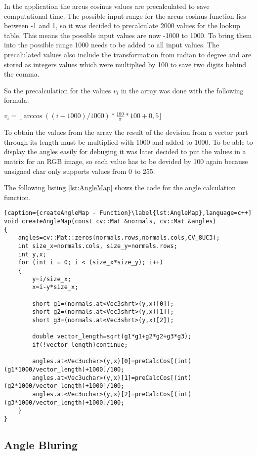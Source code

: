 In the application the arcus cosinus values are precalculated to save computational time.
The possible input range for the arcus cosinus function lies between -1 and 1, so it was decided
to precalculate 2000 values for the lookup table. This means the possible input values are now
-1000 to 1000. To bring them into the possible range 1000 needs to be added to all input values.
The precalulated values also include the transformation from radian to degree and are stored as 
integers values which were multiplied by 100 to save two digits behind the comma.

So the precalculation for the values $v_i$ in the array was done with the following formula:

$v_i=\lfloor \arccos ((i-1000)/1000) * \frac{180}{\pi}*100 + 0,5 \rfloor$

To obtain the values from the array the result of the devision from a vector part through its length
must be multiplied with 1000 and added to 1000. To be able to display the angles easily for debuging 
it was later decided to put the values in a matrix for an RGB image, so each value has to be devided 
by 100 again because unsigned char only supports values from 0 to 255.

The following listing \vref{lst:AngleMap} shows the code for the angle calculation function.

\begin{lstlisting}[caption={createAngleMap - Function}\label{lst:AngleMap},language=c++]
void createAngleMap(const cv::Mat &normals, cv::Mat &angles)
{
	angles=cv::Mat::zeros(normals.rows,normals.cols,CV_8UC3);
	int size_x=normals.cols, size_y=normals.rows;
	int y,x;
	for (int i = 0; i < (size_x*size_y); i++)
	{ 
		y=i/size_x;
		x=i-y*size_x;

		short g1=(normals.at<Vec3shrt>(y,x)[0]);
		short g2=(normals.at<Vec3shrt>(y,x)[1]);
		short g3=(normals.at<Vec3shrt>(y,x)[2]);

		double vector_length=sqrt(g1*g1+g2*g2+g3*g3);
		if(!vector_length)continue;

		angles.at<Vec3uchar>(y,x)[0]=preCalcCos[(int)(g1*1000/vector_length)+1000]/100;
		angles.at<Vec3uchar>(y,x)[1]=preCalcCos[(int)(g2*1000/vector_length)+1000]/100;
		angles.at<Vec3uchar>(y,x)[2]=preCalcCos[(int)(g3*1000/vector_length)+1000]/100;
	}
}	
\end{lstlisting}

\subsection{Angle Bluring}

